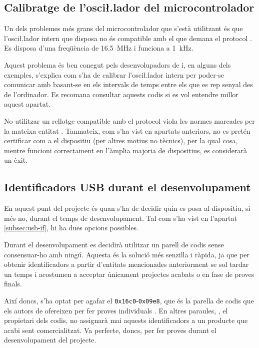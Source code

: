 \subsection{Calibratge de l'osci\l.lador del microcontrolador}

Un dels problemes més grans del microcontrolador que s'està utilitzant és que
l'osci\l.lador intern que disposa no és compatible amb el que demana el
protocol . Es disposa d'una freqüència de
\SI[round-mode=places,round-precision=1]{16.5}{\mega\hertz} i
 funciona a
\SI[round-mode=places,round-precision=0]{1}{\kilo\hertz}.

Aquest problema és ben conegut pels desenvolupadors de  i, en alguns
dels exemples, s'explica com s'ha de calibrar l'osci\l.lador intern per poder-se
comunicar amb  basant-se en els intervals de temps entre els que es
rep senyal des de l'ordinador. Es recomana consultar aquests codis
\cite{Vusb} si es vol entendre millor aquest apartat.

No utilitzar un rellotge compatible amb el protocol  viola les normes
marcades per la mateixa entitat . Tanmateix, com s'ha vist en
apartats anteriors, no es pretén certificar com a  el dispositiu
(per altres motius no tècnics), per la qual cosa, mentre funcioni correctament 
en l'àmplia majoria de dispositius, es considerarà un èxit.

\subsection{Identificadors USB durant el desenvolupament}

En aquest punt del projecte és quan s'ha de decidir
quin  es posa al dispositiu, si més no, durant el temps de
desenvolupament. Tal com s'ha vist en l'apartat \ref{subsec:usb-if}, hi ha dues
opcions possibles.

Durant el desenvolupament es decidirà utilitzar un parell de codis sense
consensuar-ho amb ningú. Aquesta és la solució més senzilla i ràpida, ja que per
obtenir identificadors a partir d'entitats mencionades anteriorment se sol
tardar un temps i acostumen a acceptar únicament projectes acabats o en fase
de proves finals.

Així doncs, s'ha optat per agafar el 
\texttt{0x16c0}-\texttt{0x09e8}, que és la
parella de codis que els autors de  ofereixen per fer proves
individuals \cite{Vusb}. En altres paraules, , el propietari dels
codis, no assignarà mai aquests identificadors a un producte que acabi sent
comercialitzat. Va perfecte, doncs, per fer proves durant el desenvolupament del
projecte.


